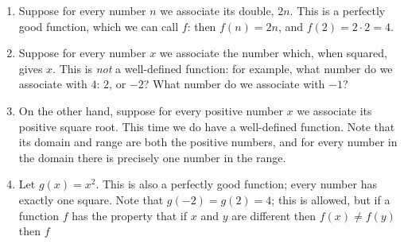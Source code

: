 \begin{ex}\leavevmode
  \begin{enumerate}
    \item Suppose for every number $ n $ we associate its double, $ 2n $. This is a perfectly good function,
          which we can call $ f $: then $ f(n) = 2n $, and $ f(2) = 2 \cdot 2 = 4 $.
          \begin{center}
          \end{center}
    \item Suppose for every number $ x $ we associate the number which, when squared, gives $ x $. This is \emph{not}
          a well-defined function: for example, what number do we associate with $4$: $2$, or $ - 2 $? What number
          do we associate with $ -1 $?
    \item On the other hand, suppose for every positive number $ x $ we associate its positive square root. This time
          we do have a well-defined function. Note that its domain and range are both the positive numbers, and for every
          number in the domain there is precisely one number in the range.
          \begin{center}
          \end{center}
    \clearpage
    \item Let $ g(x) = x^2 $. This is also a perfectly good function; every number has exactly one square. Note that $ g(-2) = g(2) = 4 $;
          this is allowed, but if a function $ f $ has the property that if $ x $ and $ y $ are different then $ f(x) \neq f(y) $ then $ f $

\end{enumerate}
\end{ex}
